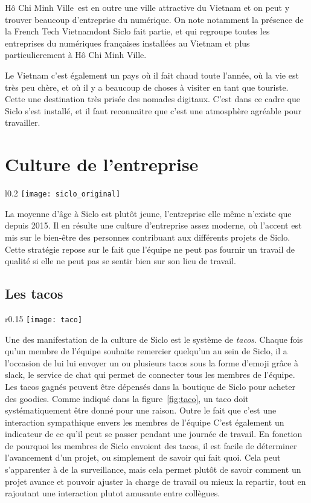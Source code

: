 \documentclass[rapport.tex]{subfiles}
\newcommand{\hcmc}{Hô Chi Minh Ville}
\begin{document}
        \hcmc~est en outre une ville attractive du Vietnam et on peut
        y trouver beaucoup d'entreprise du numérique. On note notamment la présence
        de la \og French Tech Vietnam\fg dont Siclo fait partie, et qui regroupe toutes
        les entreprises du numériques françaises installées au Vietnam et plus particulierement à \hcmc.

        Le Vietnam c'est également un pays où il fait chaud toute l'année, où la vie est très peu chère, 
        et où il y a beaucoup de choses à visiter en tant que touriste. Cette une destination très prisée
        des nomades digitaux. C'est dans ce cadre que Siclo s'est installé, et il faut reconnaitre
        que c'est une atmosphère agréable pour travailler.

        \section{Culture de l'entreprise}
        \begin{wrapfigure}{l}{0.2\textwidth}
            \texttt{[image: siclo\_original]}
        \end{wrapfigure}
        La moyenne d'âge à Siclo est plutôt jeune, l'entreprise elle même n'existe que depuis 2015.
        Il en résulte une culture d'entreprise assez moderne, où l'accent est mis sur le bien-être
        des personnes contribuant aux différents projets de Siclo. Cette stratégie repose sur le fait
        que l'équipe ne peut pas fournir un travail de qualité si elle ne peut pas se sentir bien
        sur son lieu de travail.
        
        \subsection{Les tacos}
        \begin{wrapfigure}{r}{0.15\textwidth}
            \texttt{[image: taco]}
        \end{wrapfigure}
        Une des manifestation de la culture de Siclo est le système de \emph{\og tacos\fg}. Chaque fois 
        qu'un membre de l'équipe souhaite remercier quelqu'un au sein de Siclo, il a l'occasion 
        de lui lui envoyer un ou plusieurs tacos sous la forme d'emoji grâce à
        slack, le service de chat qui permet de connecter
        tous les membres de l'équipe. Les tacos gagnés peuvent être dépensés dans la boutique de Siclo
        pour acheter des goodies. Comme indiqué dans la figure~\ref{fig:taco}, un taco doit systématiquement
        être donné pour une raison. Outre le fait que c'est une interaction sympathique envers les membres de l'équipe
        C'est également un indicateur de ce qu'il peut se passer pendant une journée de travail. En fonction de pourquoi
        les membres de Siclo envoient des tacos, il est facile de déterminer l'avancement d'un projet, ou simplement de savoir
        qui fait quoi. Cela peut s'apparenter à de la surveillance, mais cela permet plutôt de savoir comment un projet avance
        et pouvoir ajuster la charge de travail ou mieux la repartir, tout en rajoutant une interaction plutot amusante entre collègues.
\end{document}
